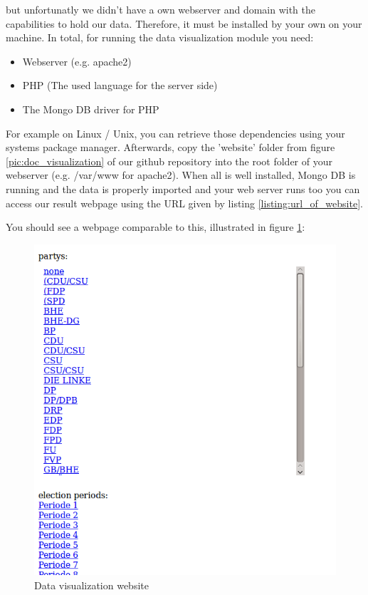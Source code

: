 \documentclass[12pt,paper=a4,nenglish]{scrreprt}
\begin{document}
but unfortunatly we didn't have a own webserver and domain with the capabilities
to hold our data. Therefore, it must be installed by your own on your machine. 
In total, for running the data visualization module you need:
\begin{itemize}
  \item Webserver (e.g. apache2)
  \item PHP (The used language for the server side)
  \item The Mongo DB driver for PHP
\end{itemize}
For example on Linux / Unix, you can retrieve those dependencies using your
systems package manager. Afterwards, copy the 'website' folder from figure
\ref{pic:doc_visualization} of our github repository into the root folder of
your webserver (e.g. /var/www for apache2). When all is well
installed, Mongo DB is running and the data is properly imported and your web
server runs too you can access our result webpage using the URL given by listing
\ref{listing:url_of_website}.
\begin{description}
	\centering
	
	\label{listing:url_of_website}%
\end{description}
You should see a webpage comparable to this, illustrated in figure \ref{pic:website}: 
\begin{figure}[H] 
	\centering
	\includegraphics[scale=0.4]{res/website_view.png}
	\caption{Data visualization website}%
	\label{pic:website}%
\end{figure}%
\end{document}
